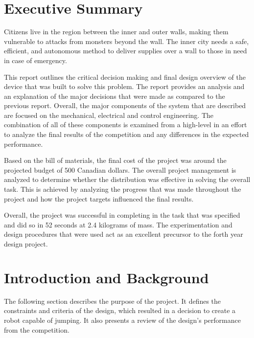 \documentclass[ece]{uw-wkrpt}
\let\oldsection\section
\renewcommand\section{\clearpage\oldsection}
\begin{document}
\section{Executive Summary}\label{sec:summary}
\onehalfspacing
Citizens live in the region between the inner and outer walls, making them vulnerable to attacks from monsters beyond the wall. The inner city needs a safe, efficient, and autonomous method to deliver supplies over a wall to those in need in case of emergency.

This report outlines the critical decision making and final design overview of the device that was built to solve this problem. The report provides an analysis and an explanation of the major decisions that were made as compared to the previous report. Overall, the major components of the system that are described are focused on the mechanical, electrical and control engineering. The combination of all of these components is examined from a high-level in an effort to analyze the final results of the competition and any differences in the expected performance. 

Based on the bill of materials, the final cost of the project was around the projected budget of 500 Canadian dollars. The overall project management is analyzed to determine whether the distribution was effective in solving the overall task. This is achieved by analyzing the progress that was made throughout the project and how the project targets influenced the final results.  

Overall, the project was successful in completing in the task that was specified and did so in 52 seconds at 2.4 kilograms of mass. The experimentation and design procedures that were used act as an excellent precursor to the forth year design project.

\tableofcontents
\listoffigures
\listoftables



\mainmatter

% 
\section{Introduction and Background}

The following section describes the purpose of the project. It defines the constraints and criteria of the design, which resulted in a decision to create a robot capable of jumping. It also presents a review of the design’s performance from the competition. 
\end{document}
